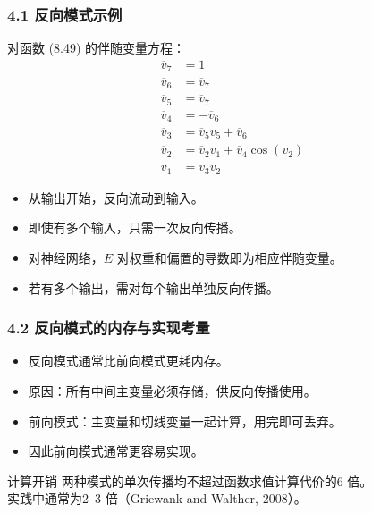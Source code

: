 \documentclass[t,aspectratio=169]{beamer} %
\begin{document}
\begin{frame}
    \frametitle{4.1 反向模式示例}
    对函数 (8.49) 的伴随变量方程：
    \begin{align}
        \overline{v}_7 &= 1 \tag{8.70} \\
        \overline{v}_6 &= \overline{v}_7 \tag{8.71} \\
        \overline{v}_5 &= \overline{v}_7 \tag{8.72} \\
        \overline{v}_4 &= -\overline{v}_6 \tag{8.73} \\
        \overline{v}_3 &= \overline{v}_5 v_5 + \overline{v}_6 \tag{8.74} \\
        \overline{v}_2 &= \overline{v}_2 v_1 + \overline{v}_4 \cos(v_2) \tag{8.75} \\
        \overline{v}_1 &= \overline{v}_3 v_2 \tag{8.76}
    \end{align}
    \begin{itemize}
        \item 从输出开始，\alert{反向流动}到输入。
        \item 即使有多个输入，只需\alert{一次反向传播}。
        \item 对神经网络，$E$ 对权重和偏置的导数即为相应伴随变量。
        \item 若有多个输出，需对每个输出单独反向传播。
    \end{itemize}
\end{frame}

\begin{frame}
    \frametitle{4.2 反向模式的内存与实现考量}
    \begin{itemize}
        \item 反向模式通常比前向模式\alert{更耗内存}。
        \item 原因：所有\alert{中间主变量}必须存储，供反向传播使用。
        \item 前向模式：主变量和切线变量一起计算，用完即可丢弃。
        \item 因此前向模式通常\alert{更容易实现}。
    \end{itemize}
    \begin{block}{计算开销}
        两种模式的单次传播均不超过函数求值计算代价的\alert{6 倍}。\\
        实践中通常为\alert{2--3 倍}（Griewank and Walther, 2008）。
    \end{block}
\end{frame}
\end{document}
